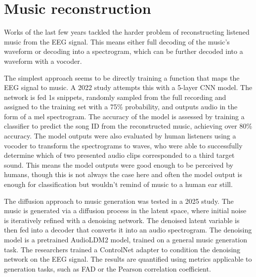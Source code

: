 





\section{Music reconstruction}

Works of the last few years tackled the harder problem of reconstructing listened music from the EEG signal.
This means either full decoding of the music's waveform or decoding into a spectrogram, which can be further decoded into a waveform with a vocoder.

The simplest approach seems to be directly training a function that maps the EEG signal to music.
A 2022 study attempts this with a 5-layer CNN model\cite{kello}.
The network is fed 1s snippets, randomly sampled from the full recording and assigned to the training set with a 75\% probability, and outputs audio in the form of a mel spectrogram. 
The accuracy of the model is assessed by training a classifier to predict the song ID from the reconstructed music, achieving over 80\% accuracy.
The model outputs were also evaluated by human listeners using a vocoder to transform the spectrograms to waves, who were able to successfully determine which of two presented audio clips corresponded to a third target sound.
This means the model outputs were good enough to be perceived by humans, though this is not always the case here and often the model output is enough for classification but wouldn't remind of music to a human ear still.

The diffusion approach to music generation was tested in a 2025 study\cite{postolache}.
The music is generated via a diffusion process in the latent space, where initial noise is iteratively refined with a denoising network.
The denoised latent variable is then fed into a decoder that converts it into an audio spectrogram.
The denoising model is a pretrained AudioLDM2 model, trained on a general music generation task.
The researchers trained a ControlNet\cite{controlnet} adapter to condition the denoising network on the EEG signal.
The results are quantified using metrics applicable to generation tasks, such as FAD or the Pearson correlation coefficient.

